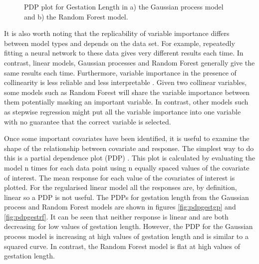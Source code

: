 \documentclass[10pt,]{article}
\begin{document}
\begin{figure}[t!]
  \centering

  \label{fig:pdp}
  \caption{
    PDP plot for Gestation Length in a) the Gaussian process model and b) the Random Forest model.
  }
\end{figure}

It is also worth noting that the replicability of variable importance differs between model types and depends on the data set.
For example, repeatedly fitting a neural network to these data gives very different results each time.
In contrast, linear models, Gaussian processes and Random Forest generally give the same results each time.
Furthermore, variable importance in the presence of collinearity is less reliable and less interpretable \citep{dormann2013collinearity}.
Given two collinear variables, some models such as Random Forest will share the variable importance between them potentially masking an important variable.
In contrast, other models such as stepwise regression might put all the variable importance into one variable with no guarantee that the correct variable is selected.

Once some important covariates have been identified, it is useful to examine the shape of the relationship between covariate and response.
The simplest way to do this is a partial dependence plot (PDP) \citep{friedman2001greedy}.
This plot is calculated by evaluating the model n times for each data point using n equally spaced values of the covariate of interest.
The mean response for each value of the covariates of interest is plotted.
For the regularised linear model all the responses are, by definition, linear so a PDP is not useful.
The PDPs for gestation length from the Gaussian process and Random Forest models are shown in figures \ref{fig:pdpgestgp} and \ref{fig:pdpgestrf}.
It can be seen that neither response is linear and are both decreasing for low values of gestation length.
However, the PDP for the Gaussian process model is increasing at high values of gestation length and is similar to a squared curve.
In contrast, the Random Forest model is flat at high values of gestation length.
\end{document}
